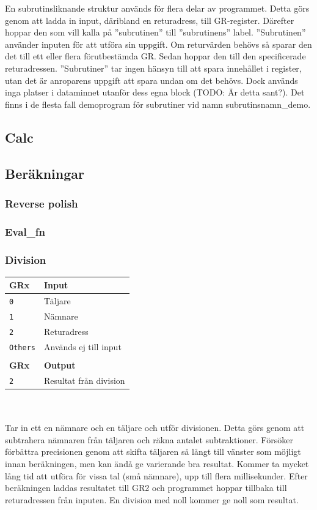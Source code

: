 \documentclass[]{article}
\begin{document}
En subrutinsliknande struktur används för flera delar av programmet. Detta görs genom att ladda in input, däribland en returadress, till GR-register. Därefter hoppar den som vill kalla på ''subrutinen'' till ''subrutinens'' label. ''Subrutinen'' använder inputen för att utföra sin uppgift. Om returvärden behövs så sparar den det till ett eller flera förutbestämda GR. Sedan hoppar den till den specificerade returadressen. ''Subrutiner'' tar ingen hänsyn till att spara innehållet i register, utan det är anroparens uppgift att spara undan om det behövs. Dock används inga platser i dataminnet utanför dess egna block (TODO: Är detta sant?). Det finns i de flesta fall demoprogram för subrutiner vid namn subrutinsnamn\_demo.

\subsection{Calc}

\subsection{Beräkningar}
\subsubsection{Reverse polish}
\subsubsection{Eval\_fn}
\subsubsection{Division}
\begin{tabular}{ll}
	\textbf{GRx}    & \textbf{Input}         \\ \hline
	\texttt{0}      & Täljare                \\
	\texttt{1}      & Nämnare                \\
	\texttt{2}      & Returadress            \\
	\texttt{Others} & Används ej till input  \\
	                &  \\
	\textbf{GRx}    & \textbf{Output}        \\ \hline
	\texttt{2}      & Resultat från division
\end{tabular}
\\\\
\noindent
Tar in ett en nämnare och en täljare och utför divisionen. Detta görs genom att subtrahera nämnaren från täljaren och räkna antalet subtraktioner. Försöker förbättra precisionen genom att skifta täljaren så långt till vänster som möjligt innan beräkningen, men kan ändå ge varierande bra resultat. Kommer ta mycket lång tid att utföra för vissa tal (små nämnare), upp till flera millisekunder. Efter beräkningen laddas resultatet till GR2 och programmet hoppar tillbaka till returadressen från inputen. En division med noll kommer ge noll som resultat.
\end{document}
